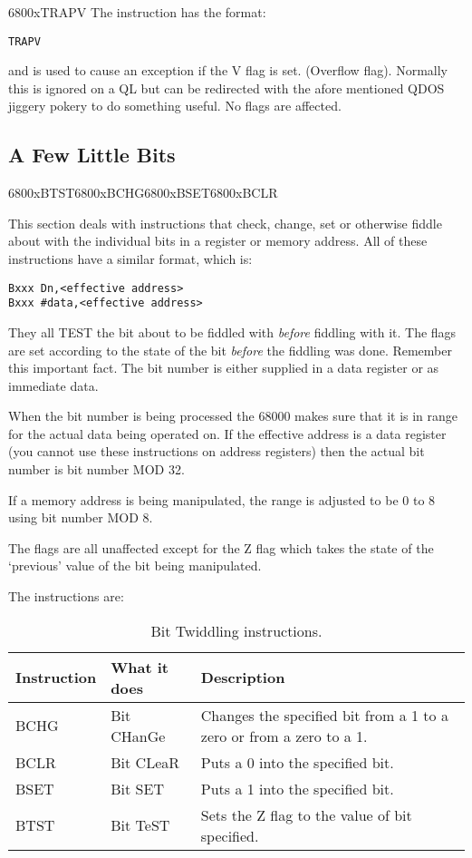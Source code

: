 \mc6800x{TRAPV}
The  instruction has the format:

\begin{lstlisting}[firstnumber=1,]
          TRAPV
\end{lstlisting}

and is used to cause an exception if the V flag is set. (Overflow
      flag). Normally this is ignored on a QL but can be redirected with the
      afore mentioned QDOS jiggery pokery to do something useful. No flags are
      affected.

\subsection{A Few Little Bits}\mc6800x{BTST}\mc6800x{BCHG}\mc6800x{BSET}\mc6800x{BCLR}
\label{ch5-bits}%

This section deals with instructions that check, change, set or
      otherwise fiddle about with the individual bits in a register or memory
      address. All of these instructions have a similar format, which is:

\begin{lstlisting}[firstnumber=1,frame=none,numbers=none]
Bxxx Dn,<effective address>
Bxxx #data,<effective address>
\end{lstlisting}

They all TEST the bit about to be fiddled with \emph{before} fiddling
      with it. The flags are set according to the state of the bit \emph{before} the
      fiddling was done. Remember this important fact. The bit number is
      either supplied in a data register or as immediate data.

When the bit number is being processed the 68000 makes sure that
      it is in range for the actual data being operated on. If the effective
      address is a data register (you cannot use these instructions on address
      registers) then the actual bit number is bit number MOD 32.

If a memory address is being manipulated, the range is adjusted to
      be 0 to 8 using bit number MOD 8.

The flags are all unaffected except for the Z flag which takes the
      state of the `previous' value of the bit being manipulated.

The instructions are:

\begin{table}[htbp]
\centering
\begin{tabular}{l l l}
\toprule
\textbf{Instruction} & \textbf{What it does} &  \textbf{Description}\\
\midrule
BCHG & Bit CHanGe & Changes the specified bit from a 1 to a zero or from a zero to a 1. \\
BCLR & Bit CLeaR & Puts a 0 into the specified bit.\\
BSET & Bit SET  & Puts a 1 into the specified bit.\\
BTST & Bit TeST & Sets the Z flag to the value of bit specified.\\
\bottomrule
\end{tabular}
\caption{Bit Twiddling instructions.}
\label{tab:BitTwiddlingInstructions}
\end{table}


